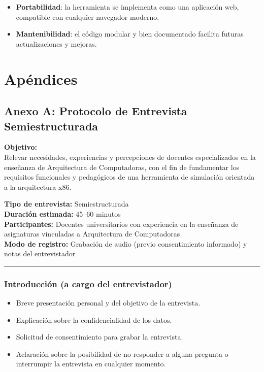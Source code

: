 \documentclass[12pt,oneside]{templates/unerthesis}
\providecommand{\tightlist}{%
  \setlength{\itemsep}{0pt}\setlength{\parskip}{0pt}}
\begin{document}
\begin{itemize}
\tightlist
\item
  \textbf{Portabilidad}: la herramienta se implementa como una aplicación web, compatible con cualquier navegador moderno.
\item
  \textbf{Mantenibilidad}: el código modular y bien documentado facilita futuras actualizaciones y mejoras.
\end{itemize}

\hypertarget{apuxe9ndices}{%
\chapter*{Apéndices}\label{apuxe9ndices}}

\hypertarget{anexoA}{%
\section{Anexo A: Protocolo de Entrevista Semiestructurada}\label{anexoA}}

\textbf{Objetivo:}\\
Relevar necesidades, experiencias y percepciones de docentes especializados en la enseñanza de Arquitectura de Computadoras, con el fin de fundamentar los requisitos funcionales y pedagógicos de una herramienta de simulación orientada a la arquitectura x86.

\textbf{Tipo de entrevista:} Semiestructurada\\
\textbf{Duración estimada:} 45--60 minutos\\
\textbf{Participantes:} Docentes universitarios con experiencia en la enseñanza de asignaturas vinculadas a Arquitectura de Computadoras\\
\textbf{Modo de registro:} Grabación de audio (previo consentimiento informado) y notas del entrevistador

\begin{center}\rule{0.5\linewidth}{0.5pt}\end{center}

\hypertarget{introducciuxf3n-a-cargo-del-entrevistador}{%
\subsection{Introducción (a cargo del entrevistador)}\label{introducciuxf3n-a-cargo-del-entrevistador}}

\begin{itemize}
\tightlist
\item
  Breve presentación personal y del objetivo de la entrevista.
\item
  Explicación sobre la confidencialidad de los datos.
\item
  Solicitud de consentimiento para grabar la entrevista.
\item
  Aclaración sobre la posibilidad de no responder a alguna pregunta o interrumpir la entrevista en cualquier momento.
\end{itemize}
\end{document}
